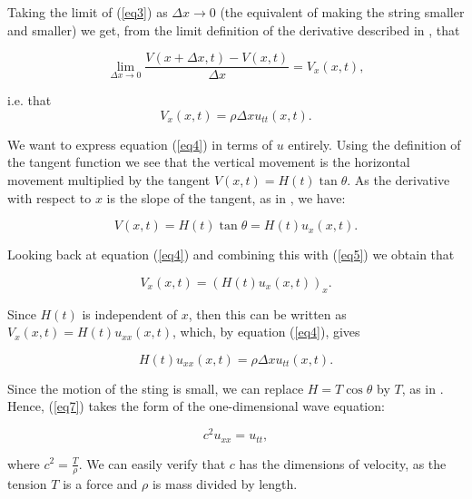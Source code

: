 \documentclass[a4paper, 12pt]{article}
\numberwithin{equation}{section}
\begin{document}
 Taking the limit of (\ref{eq3}) as $\Delta x \rightarrow 0$ (the equivalent of making the string smaller and smaller)
 we get, from the limit definition of the derivative described in \cite{Spi}, that 

 \begin{equation*}
    \lim_{\Delta x \rightarrow 0}\frac{V(x+\Delta x,t)-V(x,t)}{\Delta x}=V_x(x,t),
 \end{equation*}

i.e. that 
\begin {equation} \label{eq4}
    V_x(x,t)=\rho\Delta x u_{tt} (x,t).
\end{equation}

We want to express equation (\ref{eq4}) in terms of $u$ entirely. Using the definition of the tangent function we see that the vertical movement is the
horizontal movement multiplied by the tangent $V(x, t)=H(t)\tan{\theta}$. As the derivative with respect to $x$ is the slope of
the tangent, as in \cite{Spi}, we have:

\begin{equation} \label{eq5}
    V(x,t)=H(t)\tan{\theta}=H(t)u_x(x,t).
\end{equation}

Looking back at equation (\ref{eq4}) and combining this with (\ref{eq5}) we obtain that

\begin{equation*} 
    V_x(x,t)=(H(t)u_x(x,t))_x.
\end{equation*}

Since $H(t)$ is independent of $x$, then this can be written as $V_x(x,t)=H(t)u_{xx}(x,t)$, which, by equation (\ref{eq4}), 
gives

\begin {equation} \label{eq7}
    H(t)u_{xx}(x, t)=\rho\Delta x u_{tt}(x,t).
\end{equation}

Since the motion of the sting is small, we can replace $H=T\cos{\theta}$ by $T$, as in \cite{BoyDiP}. Hence, (\ref{eq7}) takes the 
form of the one-dimensional wave equation:

\begin{equation} \label{wave}
    c^2u_{xx}=u_{tt}, 
\end{equation}

where $c^2=\frac{T}{\rho}$. We can easily verify that $c$ has the dimensions of 
velocity, as the tension $T$ is a force and $\rho$ is mass divided by length.
\end{document}
